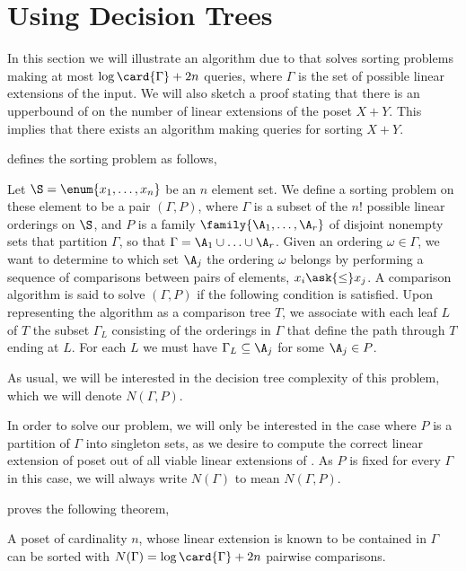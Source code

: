 \section{Using Decision Trees}
\label{tree:xy:dt}

In this section we will illustrate an algorithm due to \citet*{fredman:1976}
that solves sorting problems making at most $\log\card{\Gamma} + 2n$ queries,
where $\Gamma$ is the set of possible linear extensions of the input. We will
also sketch a proof stating that there is an upperbound of  on the
number of linear extensions of the poset $X + Y$. This implies that there
exists an algorithm making  queries for sorting $X + Y$.

\citet{fredman:1976} defines the sorting problem as follows,

\begin{problem}
Let $\S = \enum{x_1, \ldots, x_n}$ be an $n$ element set. We define a sorting
problem on these element to be a pair $(\Gamma, P)$, where $\Gamma$ is a
subset of the $n!$ possible linear orderings on $\S$, and
$P$ is a family $\family{\A_1, \ldots, \A_r}$ of disjoint nonempty sets that
partition $\Gamma$, so that $\Gamma = \A_1 \cup \ldots \cup \A_r$. Given an
ordering $\omega \in \Gamma$, we want to determine to which set $\A_j$ the
ordering $\omega$ belongs by performing a sequence of comparisons between
pairs of elements, $x_i \ask{\le} x_j$. A comparison algorithm is said to
solve $(\Gamma, P)$ if the following condition is satisfied. Upon representing
the algorithm as a comparison tree $T$, we associate with each leaf $L$ of $T$
the subset $\Gamma_L$ consisting of the orderings in $\Gamma$ that define the
path through $T$ ending at $L$. For each $L$ we must have $\Gamma_L \subseteq
\A_j$ for some $\A_j \in P$.
\end{problem}

As usual, we will be interested in the decision tree complexity of this
problem, which we will denote $N(\Gamma, P)$.

In order to solve our \XY problem, we will only be interested in the case
where $P$ is a partition of $\Gamma$ into singleton sets, as we desire to
compute the correct linear extension of poset \XY out of all viable linear
extensions of \XY. As $P$ is fixed for every $\Gamma$ in this case, we will
always write $N(\Gamma)$ to mean $N(\Gamma, P)$.

\citet{fredman:1976} proves the following theorem,

\begin{theorem}\label{theorem:fredman:1976}
A poset of cardinality $n$, whose linear extension is known to be contained in
$\Gamma$ can be sorted with $N(\Gamma) = \log \card{\Gamma} + 2n$ pairwise
comparisons.
\end{theorem}

